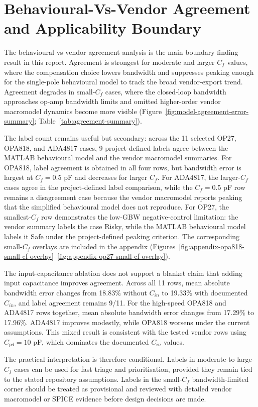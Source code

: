\section{Behavioural-Vs-Vendor Agreement and Applicability Boundary}

The behavioural-vs-vendor agreement analysis is the main boundary-finding result in this report. Agreement is strongest for moderate and larger $C_f$ values, where the compensation choice lowers bandwidth and suppresses peaking enough for the single-pole behavioural model to track the broad vendor-export trend. Agreement degrades in small-$C_f$ cases, where the closed-loop bandwidth approaches op-amp bandwidth limits and omitted higher-order vendor macromodel dynamics become more visible (Figure~\ref{fig:model-agreement-error-summary}; Table~\ref{tab:agreement-summary}).

The label count remains useful but secondary: across the 11 selected OP27, OPA818, and ADA4817 cases, 9 project-defined labels agree between the MATLAB behavioural model and the vendor macromodel summaries. For OPA818, label agreement is obtained in all four rows, but bandwidth error is largest at $C_f=0.5$ pF and decreases for larger $C_f$. For ADA4817, the larger-$C_f$ cases agree in the project-defined label comparison, while the $C_f=0.5$ pF row remains a disagreement case because the vendor macromodel reports peaking that the simplified behavioural model does not reproduce. For OP27, the smallest-$C_f$ row demonstrates the low-GBW negative-control limitation: the vendor summary labels the case Risky, while the MATLAB behavioural model labels it Safe under the project-defined peaking criterion. The corresponding small-$C_f$ overlays are included in the appendix (Figures~\ref{fig:appendix-opa818-small-cf-overlay}--\ref{fig:appendix-op27-small-cf-overlay}).

The input-capacitance ablation does not support a blanket claim that adding input capacitance improves agreement. Across all 11 rows, mean absolute bandwidth error changes from 18.83\% without $C_{in}$ to 19.33\% with documented $C_{in}$, and label agreement remains 9/11. For the high-speed OPA818 and ADA4817 rows together, mean absolute bandwidth error changes from 17.29\% to 17.96\%. ADA4817 improves modestly, while OPA818 worsens under the current assumptions. This mixed result is consistent with the tested vendor rows using $C_{pd}=10$ pF, which dominates the documented $C_{in}$ values.

The practical interpretation is therefore conditional. Labels in moderate-to-large-$C_f$ cases can be used for fast triage and prioritisation, provided they remain tied to the stated repository assumptions. Labels in the small-$C_f$ bandwidth-limited corner should be treated as provisional and reviewed with detailed vendor macromodel or SPICE evidence before design decisions are made.

